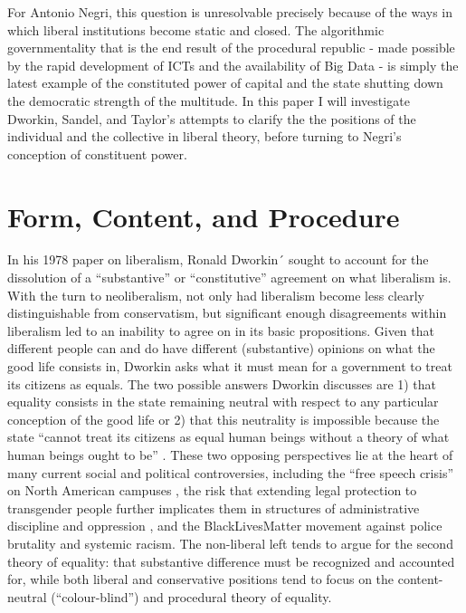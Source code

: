 \documentclass[12pt,oneside]{memoir}
\begin{document}
For Antonio Negri, this question is unresolvable precisely because of the ways in which liberal institutions become static and closed. The algorithmic governmentality that is the end result of the procedural republic - made possible by the rapid development of ICTs and the availability of Big Data - is simply the latest example of the constituted power of capital and the state shutting down the democratic strength of the multitude. In this paper I will investigate Dworkin, Sandel, and Taylor's attempts to clarify the the positions of the individual and the collective in liberal theory, before turning to Negri's conception of constituent power.

	

\section*{Form, Content, and Procedure}


In his 1978 paper on liberalism, Ronald Dworkin´ sought to account for the dissolution of a ``substantive'' or ``constitutive'' agreement on what liberalism is. With the turn to neoliberalism, not only had liberalism become less clearly distinguishable from conservatism, but significant enough disagreements within liberalism led to an inability to agree on in its basic propositions. Given that different people can and do have different (substantive) opinions on what the good life consists in, Dworkin asks what it must mean for a government to treat its citizens as equals. The two possible answers Dworkin discusses are 1) that equality consists in the state remaining neutral with respect to any particular conception of the good life or 2) that this neutrality is impossible because the state ``cannot treat its citizens as equal human beings without a theory of what human beings ought to be'' \citep[127]{Dworkin1978}. These two opposing perspectives lie at the heart of many current social and political controversies, including the ``free speech crisis'' on North American campuses \citep{Mackinnon2018}, the risk that extending legal protection to transgender people further implicates them in structures of administrative discipline and oppression \citep{Spade2015}, and the BlackLivesMatter movement against police brutality and systemic racism. The non-liberal left tends to argue for the second theory of equality: that substantive difference must be recognized and accounted for, while both liberal and conservative positions tend to focus on the content-neutral (``colour-blind'') and procedural theory of equality.
	
\end{document}
